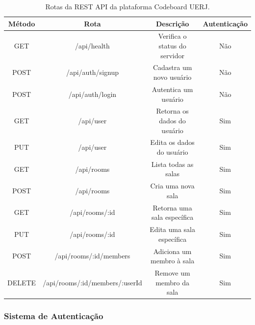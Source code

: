 \begin{table}[H]
    \centering
    \renewcommand{\arraystretch}{1.3} 
    \begin{tabular}{|c|c|c|c|}
        \hline
        \textbf{Método} & \textbf{Rota}                  & \textbf{Descrição}            & \textbf{Autenticação} \\
        \hline
        GET             & /api/health                    & Verifica o status do servidor & Não                   \\
        \hline
        POST            & /api/auth/signup               & Cadastra um novo usuário      & Não                   \\
        POST            & /api/auth/login                & Autentica um usuário          & Não                   \\
        \hline
        GET             & /api/user                      & Retorna os dados do usuário   & Sim                   \\
        PUT             & /api/user                      & Edita os dados do usuário     & Sim                   \\
        \hline
        GET             & /api/rooms                     & Lista todas as salas          & Sim                   \\
        POST            & /api/rooms                     & Cria uma nova sala            & Sim                   \\
        GET             & /api/rooms/:id                 & Retorna uma sala específica   & Sim                   \\
        PUT             & /api/rooms/:id                 & Edita uma sala específica     & Sim                   \\
        POST            & /api/rooms/:id/members         & Adiciona um membro à sala     & Sim                   \\
        DELETE          & /api/rooms/:id/members/:userId & Remove um membro da sala      & Sim                   \\
        \hline
    \end{tabular}
    \caption{Rotas da REST API da plataforma Codeboard UERJ.}
    \label{tab:rest-api-routes}
\end{table}


\subsubsection{Sistema de Autenticação}

